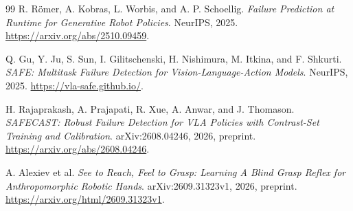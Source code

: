 \documentclass[10pt,letterpaper]{article}
\begin{document}
\begin{thebibliography}{99}
R. R\"omer, A. Kobras, L. Worbis, and A. P. Schoellig.
\emph{Failure Prediction at Runtime for Generative Robot Policies}.
NeurIPS, 2025. \url{https://arxiv.org/abs/2510.09459}.

Q. Gu, Y. Ju, S. Sun, I. Gilitschenski, H. Nishimura, M. Itkina, and F. Shkurti.
\emph{SAFE: Multitask Failure Detection for Vision-Language-Action Models}.
NeurIPS, 2025. \url{https://vla-safe.github.io/}.

H. Rajaprakash, A. Prajapati, R. Xue, A. Anwar, and J. Thomason.
\emph{SAFECAST: Robust Failure Detection for VLA Policies with Contrast-Set
Training and Calibration}. arXiv:2608.04246, 2026, preprint.
\url{https://arxiv.org/abs/2608.04246}.

A. Alexiev et al.
\emph{See to Reach, Feel to Grasp: Learning A Blind Grasp Reflex for
Anthropomorphic Robotic Hands}.
arXiv:2609.31323v1, 2026, preprint.
\url{https://arxiv.org/html/2609.31323v1}.
\end{thebibliography}
\end{document}
